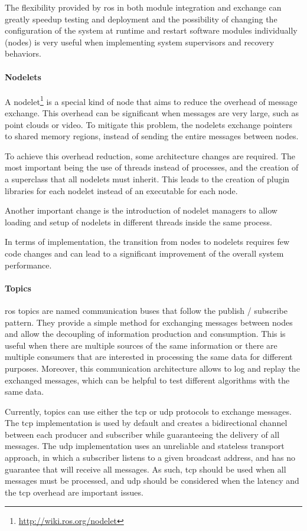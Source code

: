 The flexibility provided by \gls{ros} in both module integration and exchange can greatly speedup testing and deployment and the possibility of changing the configuration of the system at runtime and restart software modules individually (nodes) is very useful when implementing system supervisors and recovery behaviors.


\paragraph{Nodelets}

A nodelet\footnote{\url{http://wiki.ros.org/nodelet}} is a special kind of node that aims to reduce the overhead of message exchange. This overhead can be significant when messages are very large, such as point clouds or video. To mitigate this problem, the nodelets exchange pointers to shared memory regions, instead of sending the entire messages between nodes.

To achieve this overhead reduction, some architecture changes are required. The most important being the use of threads instead of processes, and the creation of a superclass that all nodelets must inherit. This leads to the creation of plugin libraries for each nodelet instead of an executable for each node.

Another important change is the introduction of nodelet managers to allow loading and setup of nodelets in different threads inside the same process.

In terms of implementation, the transition from nodes to nodelets requires few code changes and can lead to a significant improvement of the overall system performance.


\paragraph{Topics}

\gls{ros} topics are named communication buses that follow the publish / subscribe pattern. They provide a simple method for exchanging messages between nodes and allow the decoupling of information production and consumption. This is useful when there are multiple sources of the same information or there are multiple consumers that are interested in processing the same data for different purposes. Moreover, this communication architecture allows to log and replay the exchanged messages, which can be helpful to test different algorithms with the same data.

Currently, topics can use either the \gls{tcp} or \gls{udp} protocols to exchange messages. The \gls{tcp} implementation is used by default and creates a bidirectional channel between each producer and subscriber while guaranteeing the delivery of all messages. The \gls{udp} implementation uses an unreliable and stateless transport approach, in which a subscriber listens to a given broadcast address, and has no guarantee that will receive all messages. As such, \gls{tcp} should be used when all messages must be processed, and \gls{udp} should be considered when the latency and the \gls{tcp} overhead are important issues.


